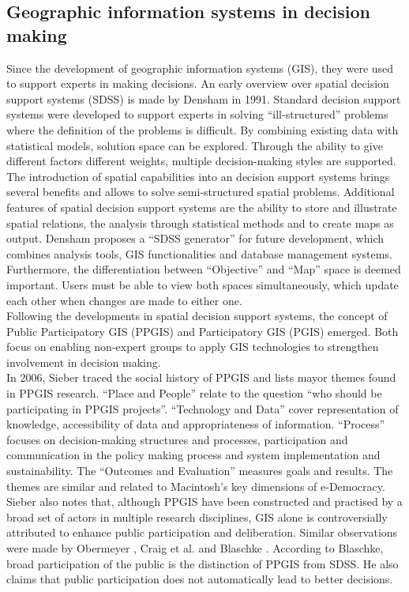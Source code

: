 \subsection{Geographic information systems in decision making}
\label{subchap:gis_stuff}
Since the development of geographic information systems (GIS), they were used to support experts in making decisions. An early overview over spatial decision support systems (SDSS) is made by Densham \cite{densham_sdss} in 1991. Standard decision support systems were developed to support experts in solving ``ill-structured'' problems where the definition of the problems is difficult. By combining existing data with statistical models, solution space can be explored. Through the ability to give different factors different weights, multiple decision-making styles are supported. The introduction of spatial capabilities into an decision support systems brings several benefits and allows to solve semi-structured spatial problems. Additional features of spatial decision support systems are the ability to store and illustrate spatial relations, the analysis through statistical methods and to create maps as output. Densham proposes a ``SDSS generator'' for future development, which combines analysis tools, GIS functionalities and database management systems. Furthermore, the differentiation between ``Objective'' and ``Map'' space is deemed important. Users must be able to view both spaces simultaneously, which update each other when changes are made to either one.\\
Following the developments in spatial decision support systems, the concept of Public Participatory GIS (PPGIS) and Participatory GIS (PGIS) emerged. Both focus on enabling non-expert groups to apply GIS technologies to strengthen involvement in decision making.\\
In 2006, Sieber \cite{Sieber2006_PublicParticipationGIS} traced the social history of PPGIS and lists mayor themes found in PPGIS research. ``Place and People'' relate to the question ``who should be participating in PPGIS projects''. ``Technology and Data'' cover representation of knowledge, accessibility of data and appropriateness of information. ``Process'' focuses on decision-making structures and processes, participation and communication in the policy making process and system implementation and sustainability. The ``Outcomes and Evaluation'' measures goals and results. The themes are similar and related to Macintosh's \cite{Macintosh2004_eParticipation_characterization} key dimensions of e-Democracy. Sieber also notes that, although PPGIS have been constructed and practised by a broad set of actors in multiple research disciplines, GIS alone is controversially attributed to enhance public participation and deliberation. Similar observations were made by Obermeyer \cite{obermeyer1998evolution}, Craig et al. \cite{Weiner2002_Participation_and_GIS_eigentlich_Craig} and Blaschke \cite{Blaschke2004_PGIS_critically_revised}. According to Blaschke, broad participation of the public is the distinction of PPGIS from SDSS. He also claims that public participation does not automatically lead to better decisions.\\
